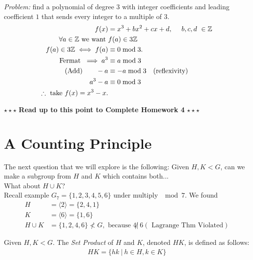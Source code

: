 \begin{example}
\textit{Problem:} find a polynomial of degree $3$ with integer coefficients and leading coefficient $1$ that sends every integer to a multiple of 3.
\begin{align}
    f(x)&=x^3+bx^2+cx+d, \ \ \ \ b,c,d \ \in \Z \nonumber \\
    \forall a \in \Z \text{ we want } &f(a)\in 3\Z \nonumber \\
    f(a)\in 3\Z \iff f(a)&\equiv 0 \mod 3. \nonumber \\
    \text{Fermat } \implies a^3&\equiv a \mod 3  \nonumber \\
    \text{ (Add) }\ \ \ \ \ -a&\equiv -a\mod 3 \ \ \ \text{(reflexivity)}  \nonumber \\
    a^3-a&\equiv 0 \mod 3 \nonumber \\
    \therefore \text{ take } f(x)= x^3 - x. \nonumber 
\end{align}
\end{example}
\steezybreak
\begin{tcolorbox}
\begin{center}
    $\star\star\star$ \textbf{Read up to this point to Complete Homework 4} $\star\star\star$
\end{center}
\end{tcolorbox}
\newpage
\section{A Counting Principle}
The next question that we will explore is the following: Given $H,K < G$, can we make a subgroup from $H$ and $K$ which contains both...\steezybreak\\

\noindent What about $H\cup K$? \\ 
Recall example $G_7=\{1,2,3,4,5,6\}$ under multiply $\mod 7$. We found 
\begin{align}
    H&=\langle 2 \rangle = \{2,4,1\} \nonumber \\
    K&=\langle 6 \rangle = \{1,6 \} \nonumber \\
    H\cup K &= \{1,2,4,6\} \not < G, \text{ because } 4 \not | \ 6 (\text{ Lagrange Thm Violated}) \nonumber
\end{align}

\begin{definition}
Given $H,K < G$. The \textit{Set Product} of $H$ and $K$, denoted $HK$, is defined as follows:\\
\begin{align}
HK = \{hk \ | \ h\in H,k\in K\} \nonumber
\end{align}
\end{definition}

